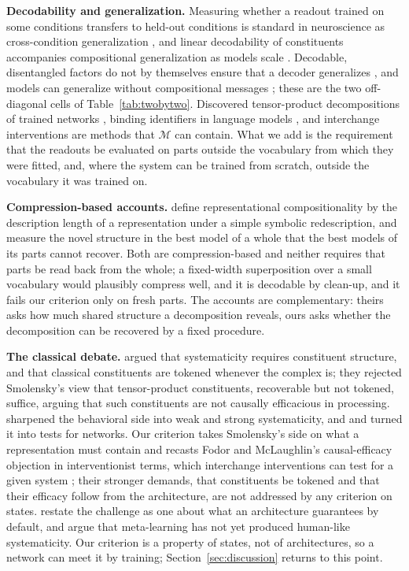 \documentclass[10pt]{article}
\theoremstyle{plain}
\theoremstyle{remark}
\newcommand{\M}{\mathcal{M}}
\begin{document}
\textbf{Decodability and generalization.} Measuring whether a readout trained on some conditions transfers to held-out conditions is standard in neuroscience as cross-condition generalization \citep{bernardi2020,ito2022}, and linear decodability of constituents accompanies compositional generalization as models scale \citep{redhardt2025}. Decodable, disentangled factors do not by themselves ensure that a decoder generalizes \citep{montero2021,schott2022}, and models can generalize without compositional messages \citep{chaabouni2020}; these are the two off-diagonal cells of Table~\ref{tab:twobytwo}. Discovered tensor-product decompositions of trained networks \citep{mccoy2019,soulos2020}, binding identifiers in language models \citep{feng2024}, and interchange interventions \citep{geiger2021,geiger2024das} are methods that $\M$ can contain. What we add is the requirement that the readouts be evaluated on parts outside the vocabulary from which they were fitted, and, where the system can be trained from scratch, outside the vocabulary it was trained on.

\textbf{Compression-based accounts.} \citet{elmoznino2024} define representational compositionality by the description length of a representation under a simple symbolic redescription, and \citet{elmoznino2026} measure the novel structure in the best model of a whole that the best models of its parts cannot recover. Both are compression-based and neither requires that parts be read back from the whole; a fixed-width superposition over a small vocabulary would plausibly compress well, and it is decodable by clean-up, and it fails our criterion only on fresh parts. The accounts are complementary: theirs asks how much shared structure a decomposition reveals, ours asks whether the decomposition can be recovered by a fixed procedure.

\textbf{The classical debate.} \citet{fodor1988} argued that systematicity requires constituent structure, and \citet{fodor1990} that classical constituents are tokened whenever the complex is; they rejected Smolensky's view \citep{smolensky1987,smolensky1988,smolensky1990} that tensor-product constituents, recoverable but not tokened, suffice, arguing that such constituents are not causally efficacious in processing. \citet{hadley1994} sharpened the behavioral side into weak and strong systematicity, and \citet{hupkes2020} and \citet{vegner2025} turned it into tests for networks. Our criterion takes Smolensky's side on what a representation must contain and recasts Fodor and McLaughlin's causal-efficacy objection in interventionist terms, which interchange interventions can test for a given system \citep{geiger2021}; their stronger demands, that constituents be tokened and that their efficacy follow from the architecture, are not addressed by any criterion on states. \citet{goodale2026} restate the challenge as one about what an architecture guarantees by default, and \citet{woydt2025} argue that meta-learning \citep{lake2023} has not yet produced human-like systematicity. Our criterion is a property of states, not of architectures, so a network can meet it by training; Section~\ref{sec:discussion} returns to this point.
\end{document}
